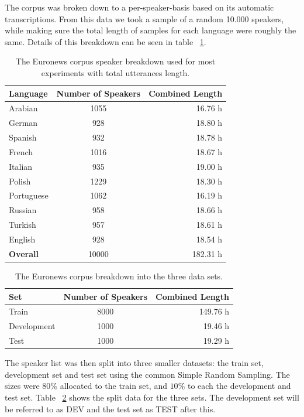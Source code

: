 The corpus was broken down to a per-speaker-basis based on its automatic transcriptions. From this data we took a sample of a random 10.000 speakers, while making sure the total length of samples for each language were roughly the same. Details of this breakdown can be seen in table ~\ref{tab:spkData}.

\begin{table}[h!]
\caption{The Euronews corpus speaker breakdown used for most experiments with total utterances length.}
\label{tab:spkData}
\centering
\begin{tabular}{| l | c | r | }
	\hline
	\textbf{Language} & \textbf{Number of Speakers} & \textbf{Combined Length} \\
	\hline
	Arabian & 1055 & 16.76 h \\
	German & 928 & 18.80 h \\
	Spanish & 932 & 18.78 h \\
	French & 1016 & 18.67 h \\  
	Italian & 935 & 19.00 h \\  
	Polish & 1229 & 18.30 h \\ 
	Portuguese & 1062 & 16.19 h \\ 
	Russian & 958 & 18.66 h \\ 
	Turkish & 957 & 18.61 h \\  
	English & 928 & 18.54 h \\ 
	\hline
	\textbf{Overall} & 10000 & 182.31 h\\
	\hline	
\end{tabular}
\end{table}

\begin{table}[h!]
\caption{The Euronews corpus breakdown into the three data sets.}
\label{tab:spkSplit}
\centering
\begin{tabular}{| l | c | r | }
	\hline
	\textbf{Set} & \textbf{Number of Speakers} & \textbf{Combined Length} \\
	\hline
	Train &  8000 & 149.76 h \\
	Development & 1000 & 19.46 h \\
	Test & 1000 & 19.29 h \\
	\hline
\end{tabular}
\end{table}

The speaker list was then split into three smaller datasets: the train set, development set and test set using the common Simple Random Sampling. The sizes were \(80\%\) allocated to the train set, and \(10\%\) to each the development  and test set. Table ~\ref{tab:spkSplit} shows the split data for the three sets.  The development set will be referred to as DEV and the test set as TEST after this.

